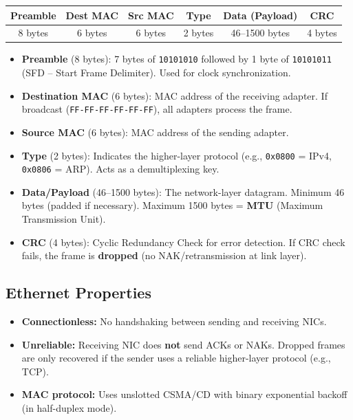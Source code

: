 \begin{keybox}
\begin{center}
\begin{tabular}{|c|c|c|c|c|c|}
\hline
\textbf{Preamble} & \textbf{Dest MAC} & \textbf{Src MAC} & \textbf{Type} & \textbf{Data (Payload)} & \textbf{CRC} \\
\hline
8 bytes & 6 bytes & 6 bytes & 2 bytes & 46--1500 bytes & 4 bytes \\
\hline
\end{tabular}
\end{center}

\begin{itemize}[noitemsep]
    \item \textbf{Preamble} (8 bytes): 7 bytes of \texttt{10101010} followed by 1 byte of \texttt{10101011} (SFD -- Start Frame Delimiter). Used for clock synchronization.
    \item \textbf{Destination MAC} (6 bytes): MAC address of the receiving adapter. If broadcast (\texttt{FF-FF-FF-FF-FF-FF}), all adapters process the frame.
    \item \textbf{Source MAC} (6 bytes): MAC address of the sending adapter.
    \item \textbf{Type} (2 bytes): Indicates the higher-layer protocol (e.g., \texttt{0x0800} = IPv4, \texttt{0x0806} = ARP). Acts as a demultiplexing key.
    \item \textbf{Data/Payload} (46--1500 bytes): The network-layer datagram. Minimum 46 bytes (padded if necessary). Maximum 1500 bytes = \textbf{MTU} (Maximum Transmission Unit).
    \item \textbf{CRC} (4 bytes): Cyclic Redundancy Check for error detection. If CRC check fails, the frame is \textbf{dropped} (no NAK/retransmission at link layer).
\end{itemize}
\end{keybox}

\begin{imagebox}
\end{imagebox}

\subsection{Ethernet Properties}

\begin{keybox}
\begin{itemize}[noitemsep]
    \item \textbf{Connectionless:} No handshaking between sending and receiving NICs.
    \item \textbf{Unreliable:} Receiving NIC does \textbf{not} send ACKs or NAKs. Dropped frames are only recovered if the sender uses a reliable higher-layer protocol (e.g., TCP).
    \item \textbf{MAC protocol:} Uses unslotted CSMA/CD with binary exponential backoff (in half-duplex mode).
\end{itemize}
\end{keybox}

